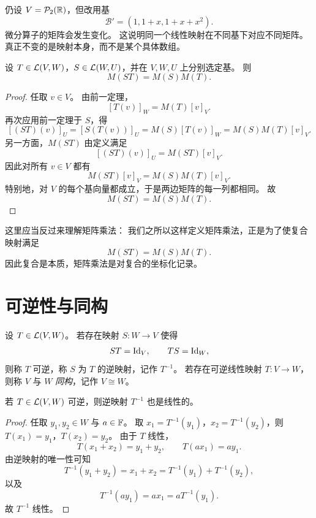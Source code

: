 \begin{example} 仍设 $V=\mathcal{P}_2(\mathbb{R})$，但改用基 \[ \mathcal{B}'=(1,1+x,1+x+x^2). \]
微分算子的矩阵会发生变化。 这说明同一个线性映射在不同基下对应不同矩阵。 真正不变的是映射本身，而不是某个具体数组。 \end{example}

\begin{theorem} 设 $T\in\mathcal{L}(V,W)$，$S\in\mathcal{L}(W,U)$，并在 $V,W,U$ 上分别选定基。 则 \[
M(ST)=M(S)M(T). \] \end{theorem}

\begin{proof} 任取 $v\in V$。 由前一定理， \[ [T(v)]_W=M(T)[v]_V. \] 再次应用前一定理于 $S$，得 \[
[(ST)(v)]_U=[S(T(v))]_U=M(S)[T(v)]_W=M(S)M(T)[v]_V. \] 另一方面，$M(ST)$ 由定义满足 \[
[(ST)(v)]_U=M(ST)[v]_V. \] 因此对所有 $v\in V$ 都有 \[ M(ST)[v]_V=M(S)M(T)[v]_V. \] 特别地，对 $V$
的每个基向量都成立，于是两边矩阵的每一列都相同。 故 \[ M(ST)=M(S)M(T). \] \end{proof}

\begin{remark} 这里应当反过来理解矩阵乘法： 我们之所以这样定义矩阵乘法，正是为了使复合映射满足 \[ M(ST)=M(S)M(T). \]
因此复合是本质，矩阵乘法是对复合的坐标化记录。 \end{remark}

\section{可逆性与同构}

\begin{definition} 设 $T\in\mathcal{L}(V,W)$。 若存在映射 $S:W\to V$ 使得 \[ ST=\mathrm{Id}_V,\qquad TS=\mathrm{Id}_W,
\] 则称 $T$ 可逆，称 $S$ 为 $T$ 的逆映射，记作 $T^{-1}$。 若存在可逆线性映射 $T:V\to W$，则称 $V$ 与 $W$
\emph{同构}，记作 $V\cong W$。 \end{definition}

\begin{proposition} 若 $T\in\mathcal{L}(V,W)$ 可逆，则逆映射 $T^{-1}$ 也是线性的。 \end{proposition}

\begin{proof} 任取 $y_1,y_2\in W$ 与 $a\in\mathbb{F}$。 取 $x_1=T^{-1}(y_1)$，$x_2=T^{-1}(y_2)$，则
$T(x_1)=y_1$，$T(x_2)=y_2$。 由于 $T$ 线性， \[ T(x_1+x_2)=y_1+y_2, \qquad T(ax_1)=ay_1. \]
由逆映射的唯一性可知 \[ T^{-1}(y_1+y_2)=x_1+x_2=T^{-1}(y_1)+T^{-1}(y_2), \] 以及 \[
T^{-1}(ay_1)=ax_1=aT^{-1}(y_1). \] 故 $T^{-1}$ 线性。 \end{proof}

